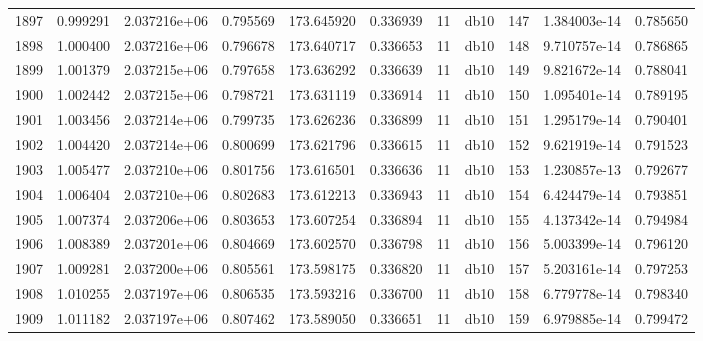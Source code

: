 \begin{tabular}{lrrrrrrlrrr}
1897 &    0.999291 &        2.037216e+06 &  0.795569 &              173.645920 &    0.336939 &      11 &         db10 &    147 &   1.384003e-14 &      0.785650 \\
1898 &    1.000400 &        2.037216e+06 &  0.796678 &              173.640717 &    0.336653 &      11 &         db10 &    148 &   9.710757e-14 &      0.786865 \\
1899 &    1.001379 &        2.037215e+06 &  0.797658 &              173.636292 &    0.336639 &      11 &         db10 &    149 &   9.821672e-14 &      0.788041 \\
1900 &    1.002442 &        2.037215e+06 &  0.798721 &              173.631119 &    0.336914 &      11 &         db10 &    150 &   1.095401e-14 &      0.789195 \\
1901 &    1.003456 &        2.037214e+06 &  0.799735 &              173.626236 &    0.336899 &      11 &         db10 &    151 &   1.295179e-14 &      0.790401 \\
1902 &    1.004420 &        2.037214e+06 &  0.800699 &              173.621796 &    0.336615 &      11 &         db10 &    152 &   9.621919e-14 &      0.791523 \\
1903 &    1.005477 &        2.037210e+06 &  0.801756 &              173.616501 &    0.336636 &      11 &         db10 &    153 &   1.230857e-13 &      0.792677 \\
1904 &    1.006404 &        2.037210e+06 &  0.802683 &              173.612213 &    0.336943 &      11 &         db10 &    154 &   6.424479e-14 &      0.793851 \\
1905 &    1.007374 &        2.037206e+06 &  0.803653 &              173.607254 &    0.336894 &      11 &         db10 &    155 &   4.137342e-14 &      0.794984 \\
1906 &    1.008389 &        2.037201e+06 &  0.804669 &              173.602570 &    0.336798 &      11 &         db10 &    156 &   5.003399e-14 &      0.796120 \\
1907 &    1.009281 &        2.037200e+06 &  0.805561 &              173.598175 &    0.336820 &      11 &         db10 &    157 &   5.203161e-14 &      0.797253 \\
1908 &    1.010255 &        2.037197e+06 &  0.806535 &              173.593216 &    0.336700 &      11 &         db10 &    158 &   6.779778e-14 &      0.798340 \\
1909 &    1.011182 &        2.037197e+06 &  0.807462 &              173.589050 &    0.336651 &      11 &         db10 &    159 &   6.979885e-14 &      0.799472 \\

\end{tabular}

